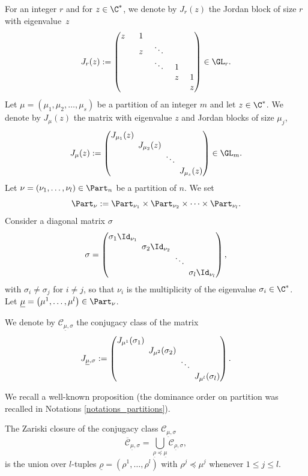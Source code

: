 For an integer $r$ and for $ z \in \C^*$, we denote by $J_r (z)$ the Jordan block of size $r$ with eigenvalue~$z$
\[\arraycolsep6.5pt
J_{r}(z):= \begin{pmatrix}
z \ & 1 & & & \\
& z & \ddots & &\\
& & \ddots & 1 & \\
& & & z & 1 \\
& & & & z
\end{pmatrix} \in \GL_{r}.
\]
Let $\mu=(\mu_1,\mu_2,\dots,\mu_s)$ be a partition of an integer $m$ and let $z \in \C^*$. We denote by $J_{\mu} (z)$ the matrix with eigenvalue $z$ and Jordan blocks of size $\mu_j$,
\[\arraycolsep2.5pt
J_{\mu} (z) :=
\begin{pmatrix}
J_{\mu_1}(z) & & &\\
& J_{\mu_2}(z) & & \\
& & \ddots & \\
& & & J_{\mu_s}(z)
\end{pmatrix} \in \GL_{m}.
\]
Let $\nu=(\nu_1,\dots,\nu_l) \in \Part_n$ be a partition of $n$. We set
\[
\Part_{\nu} := \Part_{\nu_1}\times\Part_{\nu_2} \times\dots\times \Part_{\nu_l}.
\]
Consider a diagonal matrix $\sigma$
\begin{equation}\label{eq_def_sigma}
\arraycolsep2.5pt
\sigma = \begin{pmatrix}
\sigma_1 \Id_{\nu_1} & & & \\
& \sigma_2 \Id_{\nu_2} & & \\
& & \ddots & \\
& & & \sigma_l \Id_{\nu_l}
\end{pmatrix},
\end{equation}
with $\sigma_i \ne \sigma_j$ for $i\ne j$, so that $\nu_i$ is the multiplicity of the eigenvalue $\sigma_i\in \C^*$. Let $\underline{\mu}= \left(\mu^{1},\dots,\mu^{l}\right)\in \Part_{\nu}$.
\begin{notations}\label{notations_jmus}
We denote by $\mathcal{C}_{\underline{\mu},\sigma}$ the conjugacy class of the matrix
\[\arraycolsep2.5pt
J_{\underline{\mu},\sigma}:=\begin{pmatrix}
J_{\mu^{1}}(\sigma_1) & & & \\
& J_{\mu^{2}}(\sigma_2) & & \\
& & \ddots & \\
& & & J_{\mu^{l}}(\sigma_l)
\end{pmatrix}.
\]
\end{notations}
We recall a well-known proposition (the dominance order on partition was recalled in Notations \ref{notations_partitions}).
\begin{proposition}
The Zariski closure of the conjugacy class $\mathcal{C}_{\underline{\mu},\sigma}$
\[
\overline{\mathcal{C}}_{\underline{\mu},\sigma} = \bigcup_{\underline{\rho}\preceq\underline{\mu}} \mathcal{C}_{\underline{\rho},\sigma},
\]
is the union over $l$-tuples $\underline{\rho}=\left(\rho^{1},\dots,\rho^{l}\right)$ with
$
\rho^{j}\preceq \mu^{j}$ whenever $1\le j \le l
$.
\end{proposition}

